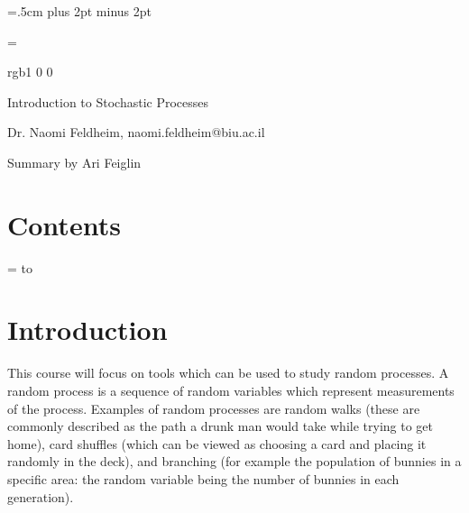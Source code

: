 

\parindent=.5cm
\parskip=3pt plus 2pt minus 2pt





\footline={}



\color rgb{1 0 0}

{\def\boxshadowcolor{rgb{.8 0 0}}

    \centerline{Introduction to Stochastic Processes}
    \smallskip
    \centerline{Dr. Naomi Feldheim, naomi.feldheim@biu.ac.il}
    \centerline{Summary by Ari Feiglin}

\eppbox

\bigskip

\section*{Contents}

\tableofcontents
\eppbox

}

\vfill\break

\color{black}

\null
\vfill\break

\newif\ifpageodd
\pageoddtrue
\headline={%
    \hbox to \hsize{\color{black}%
        \ifpageodd\hfil{\it\currsubsection\quad\bf\folio}\global\pageoddfalse%
        \else{\bf\folio\quad\it\currsubsection}\hfil\global\pageoddtrue\fi%
    }%
}

\section{Introduction}

This course will focus on tools which can be used to study random processes.
A random process is a sequence of random variables which represent measurements of the process.
Examples of random processes are random walks (these are commonly described as the path a drunk man would take while trying to get home), card shuffles (which can be viewed as choosing a card and placing
it randomly in the deck), and branching (for example the population of bunnies in a specific area: the random variable being the number of bunnies in each generation).

